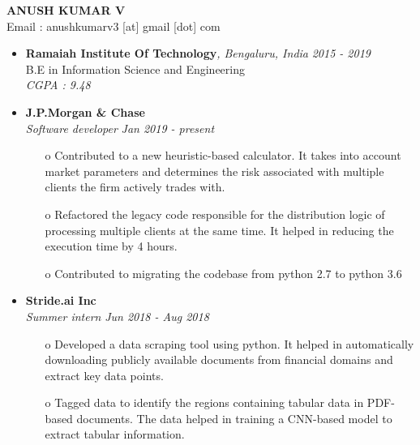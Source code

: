 \documentclass[11pt,a4paper]{article}
\begin{document}
\begin{center}
    \textbf{\huge ANUSH KUMAR V}
    \\ Email : anushkumarv3 [at] gmail [dot] com
\end{center}

\colorbox{gray}{}
    \begin{itemize}
    \item \textbf{Ramaiah Institute Of Technology}\emph{, Bengaluru, India} \hfill \textit{2015 - 2019}
    \\ B.E in Information Science and Engineering
    \\ \emph{CGPA : 9.48}
\end{itemize}


\colorbox{gray}{}

  \begin{itemize}
      \item \textbf{J.P.Morgan \& Chase}
      \\ \emph{Software developer} \hfill \textit{Jan 2019 - present}  
      \begin{itemize}
          \item[o] Contributed to a new heuristic-based calculator. It takes into account market parameters and determines the risk associated with multiple clients the firm actively trades with.
          \item[o] Refactored the legacy code responsible for the distribution logic of processing multiple clients at the same time. It helped in reducing the execution time by 4 hours.
          \item[o] Contributed to migrating the codebase from python 2.7 to python 3.6
      \end{itemize}
      \item \textbf{Stride.ai Inc}
      \\ \emph{Summer intern} \hfill \textit{Jun 2018 - Aug 2018}    
      \begin{itemize}
          \item[o] Developed a data scraping tool using python. It helped in automatically downloading publicly available documents from financial domains and extract key data points.
          \item[o] Tagged data to identify the regions containing tabular data in PDF-based documents. The data helped in training a CNN-based model to extract tabular information. 
      \end{itemize}
  \end{itemize}
  
\end{document}
